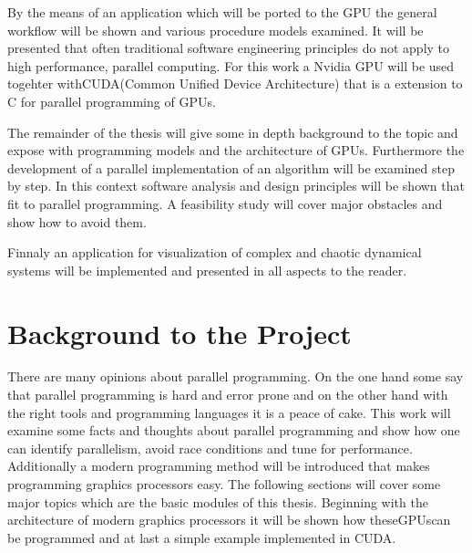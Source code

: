 By the means of an application which will be ported to the \gls{GPU} the general
workflow will be shown and various procedure models examined. It will be
presented that often traditional software engineering principles do not
apply to high performance, parallel computing. For this work a Nvidia \gls{GPU} will
be used togehter with\gls{CUDA}(Common Unified Device Architecture) that is a
extension to C for parallel programming of GPUs. 

The remainder of the thesis will give some in depth background to the topic and
expose with programming models and the architecture of GPUs. Furthermore the
development of a parallel implementation of an algorithm will be examined step
by step. In this context software analysis and design principles will be shown
that fit to parallel programming. A feasibility study will cover major obstacles
and show how to avoid them.

Finnaly an application for visualization of complex and chaotic dynamical
systems will be implemented and presented in all aspects to the reader.
\section*{Background to the Project} 
\label{sub:background_to_the_project} 
There are many opinions about parallel programming. On the one hand some say
that parallel programming is hard and error prone and on the other hand with the
right tools and programming languages it is a peace of cake. This work will
examine some facts and thoughts about parallel programming and show how one can
identify parallelism, avoid race conditions and tune for performance.
Additionally a modern programming method will be introduced that makes
programming graphics processors easy. The following sections will cover some
major topics which are the basic modules of this thesis. Beginning with the
architecture of modern graphics processors it will be shown how these\glspl{GPU}can
be programmed and at last a simple example implemented in CUDA. 

